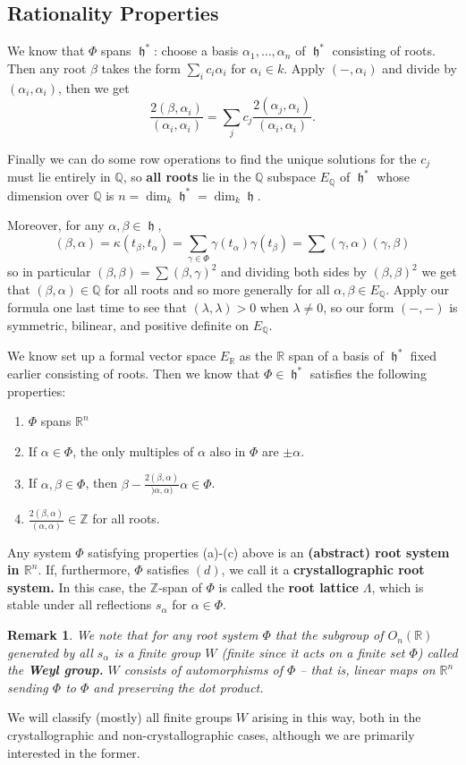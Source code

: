 \documentclass[12pt]{article}
\theoremstyle{nonumberbreak}
\theoremstyle{changebreak}
\theoremstyle{nonumberbreak}
\theoremstyle{change}
\newtheorem{rmk}[thm]{Remark}
\newcommand*{\Z}{
\mathbb{Z}
}
\newcommand*{\R}{
\mathbb{R}
}
\newcommand*{\Q}{
\mathbb{Q}
}
\DeclareMathOperator{\h}{\mathfrak{h}}
\begin{document}
\subsection{Rationality Properties}
We know that $\Phi$ spans $\h^*$: choose a basis $\alpha_1,\dots,\alpha_n$ of $\h^*$ consisting of roots. Then any root $\beta$ takes the form 
$\sum_i c_i\alpha_i$ for $\alpha_i\in k$. Apply $(-,\alpha_i)$ and divide by $(\alpha_i,\alpha_i)$, then we get
\[\frac{2(\beta,\alpha_i)}{(\alpha_i,\alpha_i)}=\sum_j c_j\frac{2(\alpha_j,\alpha_i)}{(\alpha_i,\alpha_i)}.\]

Finally we can do some row operations to find the unique solutions for the $c_j$ must lie entirely in $\Q$, so \textbf{all roots} lie in the $\Q$ subspace $E_\Q$
of $\h^*$ whose dimension over $\Q$ is $n=\dim_k\h^*=\dim_k\h$.

Moreover, for any $\alpha,\beta\in\h$,
\[(\beta,\alpha)=\kappa(t_\beta,t_\alpha)=\sum_{\gamma\in\Phi}\gamma(t_\alpha)\gamma(t_\beta)=\sum (\gamma,\alpha)(\gamma,\beta)\]
so in particular $(\beta,\beta)=\sum (\beta,\gamma)^2$ and dividing both sides by $(\beta,\beta)^2$ we get that $(\beta,\alpha)\in \Q$ for all roots and so more generally
for all $\alpha,\beta\in E_\Q$. Apply our formula one last time to see
that $(\lambda,\lambda)>0$ when $\lambda\ne 0$, so our form $(-,-)$ is symmetric, bilinear, and positive definite on $E_\Q$.

We know set up a formal vector space $E_\R$ as the $\R$ span of a basis of $\h^*$ fixed earlier consisting of roots. Then we know that
$\Phi\in\h^*$ satisfies the following properties:
\begin{enumerate}
	\item $\Phi$ spans $\R^n$
	\item If $\alpha\in\Phi$, the only multiples of $\alpha$ also in $\Phi$ are $\pm\alpha$.
	\item If $\alpha,\beta\in\Phi$, then $\beta-\frac{2(\beta,\alpha)}{)\alpha,\alpha)}\alpha\in\Phi$.
	\item $\frac{2(\beta,\alpha)}{(\alpha,\alpha)}\in\Z$ for all roots.
\end{enumerate}
\begin{defn}
	Any system $\Phi$ satisfying properties (a)-(c) above is an \textbf{(abstract) root system in $\R^n$}. If, furthermore,
	$\Phi$ satisfies $(d)$, we call it a \textbf{crystallographic root system.} In this case, the $\Z$-span of $\Phi$ is called the
	\textbf{root lattice} $\Lambda$, which is stable under all reflections $s_\alpha$ for $\alpha\in\Phi$.
\end{defn}
\begin{rmk}
	We note that for any root system $\Phi$ that the subgroup of $O_n(\R)$ generated by all $s_\alpha$ is a finite group $W$
	(finite since it acts on a finite set $\Phi$) called the \textbf{Weyl group.} $W$ consists of automorphisms of $\Phi$ -- that is,
	linear maps on $\R^n$ sending $\Phi$ to $\Phi$ and preserving the dot product.
\end{rmk}
We will classify (mostly) all finite groups $W$ arising in this way, both in the crystallographic and non-crystallographic cases, although we are primarily interested in the former.
\end{document}
